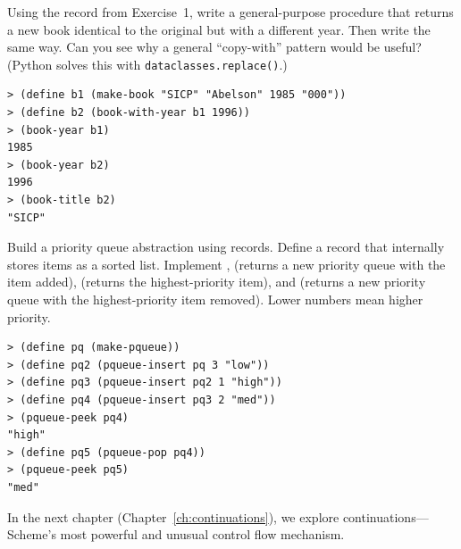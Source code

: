 \begin{exercise}
Using the  record from Exercise~1, write a general-purpose  procedure that returns a new book identical to the original but with a different year. Then write  the same way. Can you see why a general ``copy-with'' pattern would be useful? (Python solves this with \texttt{dataclasses.replace()}.)

\begin{lstlisting}[style=repl]
> (define b1 (make-book "SICP" "Abelson" 1985 "000"))
> (define b2 (book-with-year b1 1996))
> (book-year b1)
1985
> (book-year b2)
1996
> (book-title b2)
"SICP"
\end{lstlisting}
\end{exercise}

\begin{exercise}
Build a priority queue abstraction using records. Define a  record that internally stores items as a sorted list. Implement ,  (returns a new priority queue with the item added),  (returns the highest-priority item), and  (returns a new priority queue with the highest-priority item removed). Lower numbers mean higher priority.

\begin{lstlisting}[style=repl]
> (define pq (make-pqueue))
> (define pq2 (pqueue-insert pq 3 "low"))
> (define pq3 (pqueue-insert pq2 1 "high"))
> (define pq4 (pqueue-insert pq3 2 "med"))
> (pqueue-peek pq4)
"high"
> (define pq5 (pqueue-pop pq4))
> (pqueue-peek pq5)
"med"
\end{lstlisting}
\end{exercise}

In the next chapter (Chapter~\ref{ch:continuations}), we explore continuations---Scheme's most powerful and unusual control flow mechanism.

\chapterend

